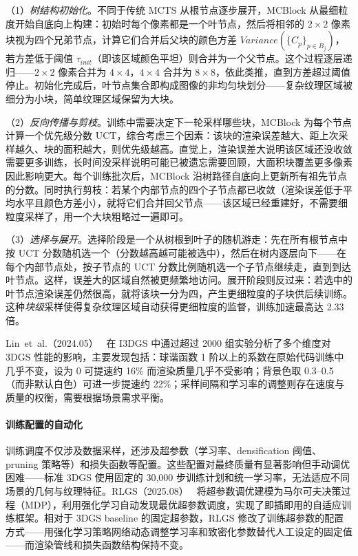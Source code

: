 （1）\emph{树结构初始化}。不同于传统 MCTS 从根节点逐步展开，MCBlock 从最细粒度开始自底向上构建：初始时每个像素都是一个叶节点，然后将相邻的 $2 \times 2$ 像素块视为四个兄弟节点，计算它们合并后父块的颜色方差 $Variance(\{C_p\}_{p \in B_j})$，若方差低于阈值 $\tau_{init}$（即该区域颜色平坦）则合并为一个父节点。这个过程逐层递归——$2 \times 2$ 像素合并为 $4 \times 4$，$4 \times 4$ 合并为 $8 \times 8$，依此类推，直到方差超过阈值停止。初始化完成后，叶节点集合即构成图像的非均匀块划分——复杂纹理区域被细分为小块，简单纹理区域保留为大块。

（2）\emph{反向传播与剪枝}。训练中需要决定下一轮采样哪些块，MCBlock 为每个节点计算一个优先级分数 UCT，综合考虑三个因素：该块的渲染误差越大、距上次采样越久、块的面积越大，则优先级越高。直觉上，渲染误差大说明该区域还没收敛需要更多训练，长时间没采样说明可能已被遗忘需要回顾，大面积块覆盖更多像素因此影响更大。每个训练批次后，MCBlock 沿树路径自底向上更新所有祖先节点的分数。同时执行剪枝：若某个内部节点的四个子节点都已收敛（渲染误差低于平均水平且颜色方差小），就将它们合并回父节点——该区域已经重建好，不需要细粒度采样了，用一个大块粗略过一遍即可。

（3）\emph{选择与展开}。选择阶段是一个从树根到叶子的随机游走：先在所有根节点中按 UCT 分数随机选一个（分数越高越可能被选中），然后在树内逐层向下——在每个内部节点处，按子节点的 UCT 分数比例随机选一个子节点继续走，直到到达叶节点。这样，误差大的区域自然被更频繁地访问。展开阶段则反过来：若选中的叶节点渲染误差仍然很高，就将该块一分为四，产生更细粒度的子块供后续训练。这种\emph{块级}采样使得复杂纹理区域自动获得更细粒度的监督，训练加速最高达 2.33 倍。

Lin~et~al.（2024.05）~\cite{2405_06408} 在 I3DGS 中通过超过 2000 组实验分析了多个维度对 3DGS 性能的影响，主要发现包括：球谐函数 1 阶以上的系数在原始代码训练中几乎不变，设为 0 可提速约 16\% 而渲染质量几乎不受影响；背景色取 0.3--0.5（而非默认白色）可进一步提速约 22\%；采样间隔和学习率的调整则存在速度与质量的权衡，需要根据场景需求平衡。

\paragraph{训练配置的自动化}

训练调度不仅涉及数据采样，还涉及超参数（学习率、densification 阈值、pruning 策略等）和损失函数等配置。这些配置对最终质量有显著影响但手动调优困难——标准 3DGS 使用固定的 30,000 步训练计划和统一学习率，无法适应不同场景的几何与纹理特征。RLGS（2025.08）~\cite{2508_04078} 将超参数调优建模为马尔可夫决策过程（MDP），利用强化学习自动发现最优超参数调度，实现了即插即用的自适应训练框架。相对于 3DGS baseline 的固定超参数，RLGS 修改了训练超参数的配置方式——用强化学习策略网络动态调整学习率和致密化参数替代人工设定的固定值——而渲染管线和损失函数结构保持不变。

